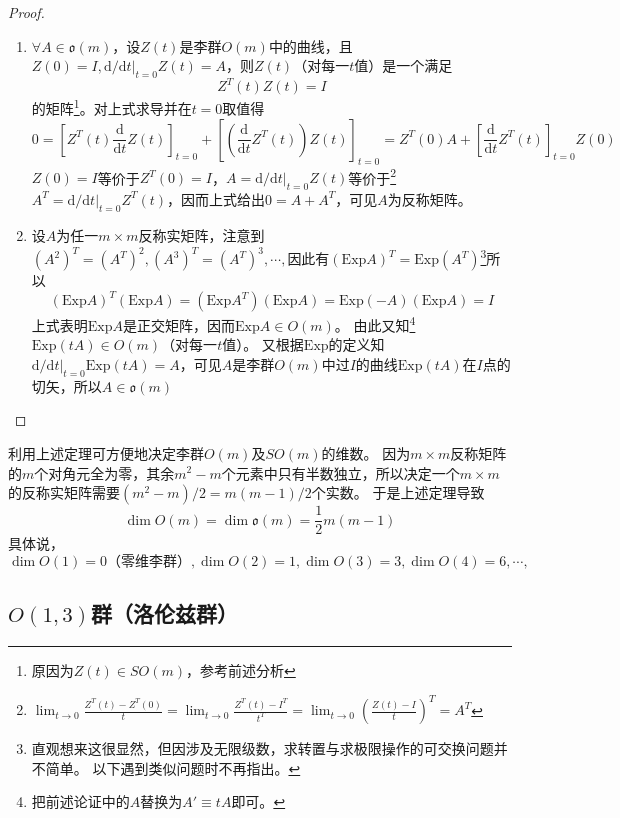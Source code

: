 \begin{proof}
    \begin{enumerate}[（A）]
        \item $\forall A \in \mathfrak{o}(m)$，设$Z(t)$是李群$O(m)$中的曲线，且$Z(0) = I, \mathrm{d} / \mathrm{d}t|_{t = 0}Z(t) = A$，则$Z(t)$（对每一$t$值）是一个满足
        $$Z^T(t)Z(t) = I$$
        的矩阵\footnote{
            原因为$Z(t) \in SO(m)$，参考前述分析
        }。对上式求导并在$t = 0$取值得
        $$0 = \left[Z^T(t)\frac{\mathrm{d}}{\mathrm{d}t}Z(t)\right]_{t = 0} + \left[\left(\frac{\mathrm{d}}{\mathrm{d}t}Z^T(t)\right)Z(t)\right]_{t = 0} = Z^T(0)A + \left[\frac{\mathrm{d}}{\mathrm{d}t}Z^T(t)\right]_{t = 0}Z(0)$$
        $Z(0) = I$等价于$Z^T(0) = I$，$A = \mathrm{d} / \mathrm{d}t|_{t = 0}Z(t)$等价于\footnote{
            $\displaystyle\lim_{t \to 0} \frac{Z^T(t) - Z^T(0)}{t} = \lim_{t \to 0} \frac{Z^T(t) - I^T}{t^T} = \lim_{t \to 0}(\frac{Z(t) - I}{t})^T = A^T$
        }$A^T = \mathrm{d} / \mathrm{d}t|_{t = 0}Z^T(t)$，因而上式给出$0 = A + A^T$，可见$A$为反称矩阵。
        \item 设$A$为任一$m \times m$反称实矩阵，注意到$(A^2)^T = (A^T)^2, (A^3)^T = (A^T)^3, \cdots, $因此有$(\mathrm{Exp}A)^T = \mathrm{Exp}(A^T)$\footnote{
            直观想来这很显然，但因涉及无限级数，求转置与求极限操作的可交换问题并不简单。
            以下遇到类似问题时不再指出。
        }所以
        $$(\mathrm{Exp}A)^T(\mathrm{Exp}A) = (\mathrm{Exp}A^T)(\mathrm{Exp}A) = \mathrm{Exp}(-A)(\mathrm{Exp}A) = I$$
        上式表明$\mathrm{Exp}A$是正交矩阵，因而$\mathrm{Exp}A \in O(m)$。
        由此又知\footnote{
            把前述论证中的$A$替换为$A' \equiv tA$即可。
        }$\mathrm{Exp}(tA) \in O(m)$（对每一$t$值）。
        又根据$\mathrm{Exp}$的定义知$\mathrm{d} / \mathrm{d}t|_{t = 0}\mathrm{Exp}(tA) = A$，可见$A$是李群$O(m)$中过$I$的曲线$\mathrm{Exp}(tA)$在$I$点的切矢，所以$A \in \mathfrak{o}(m)$
    \end{enumerate}
\end{proof}

利用上述定理可方便地决定李群$O(m)$及$SO(m)$的维数。
因为$m \times m$反称矩阵的$m$个对角元全为零，其余$m^2 - m$个元素中只有半数独立，所以决定一个$m \times m$的反称实矩阵需要$(m^2 - m) / 2 = m(m - 1) / 2$个实数。
于是上述定理导致
$$\dim O(m) = \dim\mathfrak{o}(m) = \frac{1}{2}m(m - 1)$$
具体说，
$$\dim O(1) = 0\text{（零维李群）}, \dim O(2) = 1, \dim O(3) = 3, \dim O(4) = 6, \cdots, $$

\subsection{$O(1, 3)$群（洛伦兹群）}

